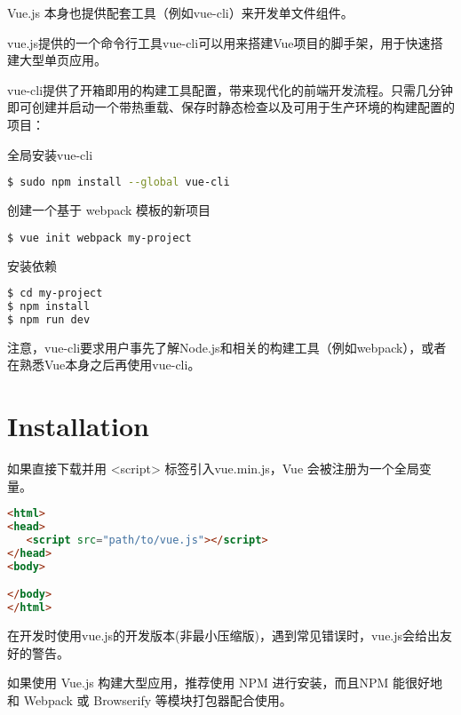 Vue.js 本身也提供配套工具（例如vue-cli）来开发单文件组件。


vue.js提供的一个命令行工具vue-cli可以用来搭建Vue项目的脚手架，用于快速搭建大型单页应用。

vue-cli提供了开箱即用的构建工具配置，带来现代化的前端开发流程。只需几分钟即可创建并启动一个带热重载、保存时静态检查以及可用于生产环境的构建配置的项目：


\begin{compactitem}
\item 全局安装vue-cli

\begin{lstlisting}[language=bash]
$ sudo npm install --global vue-cli
\end{lstlisting}

\item 创建一个基于 webpack 模板的新项目

\begin{lstlisting}[language=bash]
$ vue init webpack my-project
\end{lstlisting}

\item 安装依赖

\begin{lstlisting}[language=bash]
$ cd my-project
$ npm install
$ npm run dev
\end{lstlisting}
\end{compactitem}

注意，vue-cli要求用户事先了解Node.js和相关的构建工具（例如webpack），或者在熟悉Vue本身之后再使用vue-cli。





\section{Installation}


如果直接下载并用 <script> 标签引入vue.min.js，Vue 会被注册为一个全局变量。

\begin{lstlisting}[language=HTML]
<html>
<head>
   <script src="path/to/vue.js"></script>
</head>
<body>

</body>
</html>
\end{lstlisting}

在开发时使用vue.js的开发版本(非最小压缩版)，遇到常见错误时，vue.js会给出友好的警告。

如果使用 Vue.js 构建大型应用，推荐使用 NPM 进行安装，而且NPM 能很好地和 Webpack 或 Browserify 等模块打包器配合使用。


